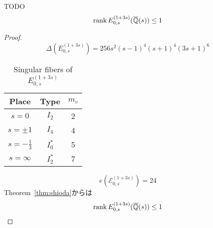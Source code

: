 \documentclass[main]{subfiles}
\begin{document}
\begin{thm}
    TODO
    \begin{equation}
        \operatorname{rank} E_{0,s}^{(1 + 3s)}(\overline{\mathbb{Q}}(s)) \leq 1
    \end{equation}
\end{thm}
\begin{proof}
    \begin{equation}
        \Delta(E_{0,s}^{(1 + 3s)}) = 256s^{2}(s - 1)^{4}(s + 1)^{4}(3s + 1)^{6}
    \end{equation}
    \begin{table}[h]
        \centering
        \caption{Singular fibers of $E_{0,s}^{(1 + 3s)}$}
        \begin{tabular}{|c|c|c|}
            \hline
            Place            & Type    & $m_v$ \\
            \hline
            $s=0$            & $I_2$   & 2     \\
            $s=\pm 1$        & $I_4$   & 4     \\
            $s=-\frac{1}{3}$ & $I_0^*$ & 5     \\
            $s=\infty$       & $I_2^*$ & 7     \\
            \hline
        \end{tabular}
    \end{table}
    \begin{equation}
        e(\mathcal{E}_{0,s}^{(1 + 3s)}) = 24
    \end{equation}
    Theorem~\ref{thm:shioda}からは
    \begin{equation}
        \operatorname{rank} E_{0,s}^{(1 + 3s)}(\overline{\mathbb{Q}}(s)) \leq 1
    \end{equation}
\end{proof}
\end{document}
